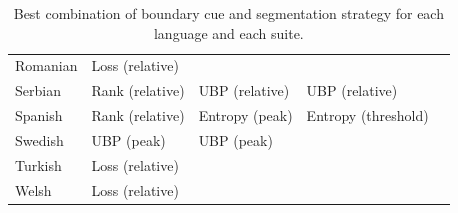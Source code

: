 \begin{table}[t]
\begin{tabular}{lllll}
    Romanian & Loss (relative) &  &  &  \\
    Serbian & Rank (relative) & UBP (relative) & UBP (relative) &  \\
    Spanish & Rank (relative) & Entropy (peak) & Entropy (threshold) &  \\
    Swedish & UBP (peak) & UBP (peak) &  &  \\
    Turkish & Loss (relative) &  &  &  \\
    Welsh & Loss (relative) &  &  &  \\
    \bottomrule
    \end{tabular}
    \caption{Best combination of boundary cue and segmentation strategy for each language and each suite.}
    \label{tab:15-bestcuesfull}
\end{table}